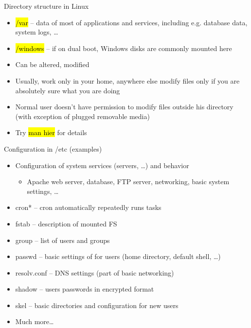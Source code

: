 \documentclass[compress, ucs, xelatex, 11pt, xcolor=svgnames,
  hyperref={
    bookmarks=true,
    unicode=true,
    colorlinks=true,
    pdftitle={Linux, command line and MetaCentrum},
    plainpages=false,
    pdfauthor={Vojtech Zeisek},
    pdfsubject={Course about use of Linux command line, writing shell scripts and using MetaCentrum of CESNET},
    pdfcreator={XeLaTeX},
    pdfkeywords={Linux, GNU, BASH, shell, command line, MetaCentrum},
    linkcolor=Red,
    anchorcolor=Blue,
    citecolor=Purple,
    filecolor=DodgerBlue,
    menucolor=DarkOrchid,
    urlcolor=DeepSkyBlue,
    pdftex},
  url={hyphens, lowtilde} %
  ]{beamer}
\renewcommand{\texttt}[1]{\hl{\ttfamily #1}}
\renewcommand{\alert}[1]{\textcolor{red}{#1}}
\begin{document}
\begin{frame}[allowframebreaks]{Directory structure in Linux}
\begin{itemize}
  \item \alert{\texttt{/var}} -- data of most of applications and services, including e.g. database data, system logs, \ldots
  \item \alert{\texttt{/windows}} -- if on dual boot, Windows disks are commonly mounted here
  \item Can be altered, modified
  \item Usually, work only in your home, anywhere else modify files only if you are absolutely sure what you are doing
  \item Normal user doesn't have permission to modify files outside his directory (with exception of plugged removable media)
  \item Try \texttt{man hier} for details
\end{itemize}
\end{frame}

\begin{frame}{Configuration in /etc (examples)}
\begin{itemize}
  \item Configuration of system services (servers, \ldots) and behavior
  \begin{itemize}
    \item Apache web server, database, FTP server, networking, basic system settings, \ldots
  \end{itemize}
  \item cron* -- cron automatically repeatedly runs tasks
  \item fstab -- description of mounted FS
  \item group -- list of users and groups
  \item passwd -- basic settings of for users (home directory, default shell, \ldots)
  \item resolv.conf --  DNS settings (part of basic networking)
  \item shadow -- users passwords in encrypted format
  \item skel -- basic directories and configuration for new users
  \item Much more\ldots
\end{itemize}
\end{frame}
\end{document}
